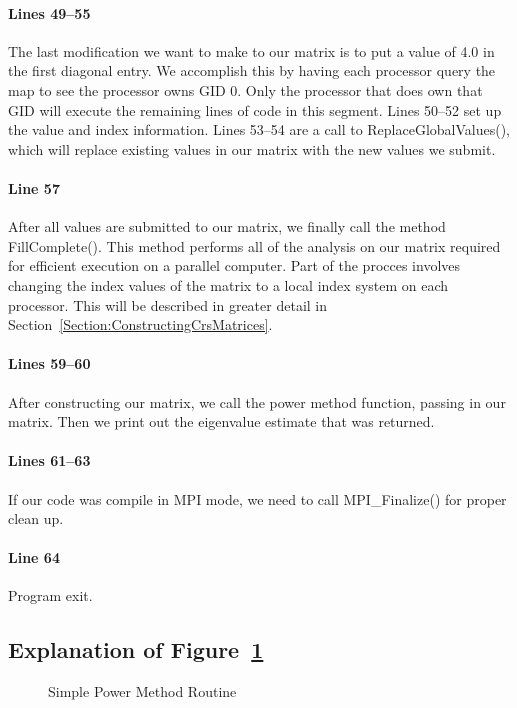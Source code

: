 \documentclass[12pt,relax]{EpetraUserGuide}
\begin{document}
\paragraph{Lines 49--55}
The last modification we want to make to our matrix is to put a value
of 4.0 in the first diagonal entry.  We accomplish this by having each
processor query the map to see the processor owns GID 0.  Only the
processor that does own that GID will execute the remaining lines of
code in this segment.  Lines 50--52 set up the value and index
information.  Lines 53--54 are a call to ReplaceGlobalValues(), which
will replace existing values in our matrix with the new values we submit.
\paragraph{Line 57}
After all values are submitted to our matrix, we finally call the
method FillComplete().  This method performs all of the analysis
on our matrix required for efficient execution on a parallel
computer.  Part of the procces involves changing the index values of
the matrix to a local index system on each processor.  This will be
described in greater detail in
Section~\ref{Section:ConstructingCrsMatrices}.
\paragraph{Lines 59--60}
After constructing our matrix, we call the power method function,
passing in our matrix.  Then we print out the eigenvalue estimate that
was returned.
\paragraph{Lines 61--63}
If our code was compile in MPI mode, we need to call MPI\_Finalize()
for proper clean up.
\paragraph{Line 64} Program exit.

\subsection{Explanation of Figure~\ref{Figure:PowerMethod}}

\begin{figure}
\begin{center}

\end{center}
\caption{\label{Figure:PowerMethod} Simple Power Method Routine}
\end{figure}
\end{document}
